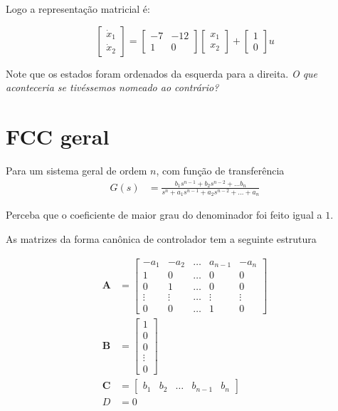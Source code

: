 \documentclass[
]{book}
\begin{document}
Logo a representação matricial é:

\[
\left[\begin{matrix}\dot{x}_1\\\dot{x}_2\end{matrix}\right]=\left[\begin{matrix}-7 & -12\\1 & 0\end{matrix}\right]\left[\begin{matrix}x_{1}\\x_{2}\end{matrix}\right]+\left[\begin{matrix}1\\0\end{matrix}\right]u
\]

Note que os estados foram ordenados da esquerda para a direita. \emph{O que aconteceria se tivéssemos nomeado ao contrário?}

\hypertarget{fcc-geral}{%
\section{FCC geral}\label{fcc-geral}}

Para um sistema geral de ordem \(n\), com função de transferência
\[
\begin{aligned}
    G(s) &= \frac{b_1s^{n-1}+b_2s^{n-2}+\ldots b_n}{s^n+a_1s^{n-1}+a_2s^{n-2}+\ldots + a_n}
\end{aligned}
\]

Perceba que o coeficiente de maior grau do denominador foi feito igual a \(1\).

As matrizes da forma canônica de controlador tem a seguinte estrutura

\[
\begin{aligned}
    \mathbf{A} &= \left[\begin{array}{cccccc} 
                  -a_1 & -a_2 & \ldots & a_{n-1} &-a_n\\
                     1 & 0 & \ldots & 0 & 0 \\
                     0 & 1 & \ldots & 0 & 0 \\
                     \vdots & \vdots & \ldots & \vdots& \vdots \\
                     0 & 0 & \ldots  & 1 & 0
    \end{array}\right]\\
    \mathbf{B} &= \left[\begin{array}{cccccc} 
                  1 \\ 0 \\ 0 \\ \vdots \\ 0 
    \end{array}\right]\\
    \mathbf{C} &= \left[\begin{array}{cccccc} 
                  b_1 & b_2 & \ldots & b_{n-1} & b_n 
    \end{array}\right]\\
    D &=0
\end{aligned}
\]
\end{document}
